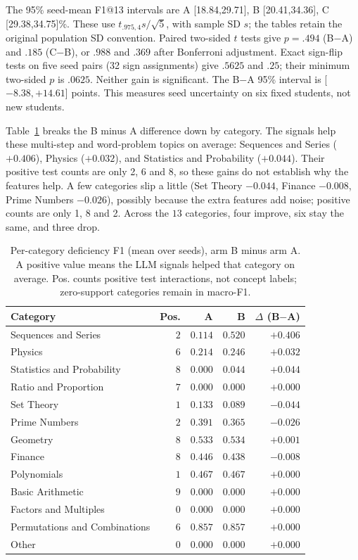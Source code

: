 \documentclass[11pt]{article}
\begin{document}
The 95\% seed-mean F1@13 intervals are A [18.84,29.71], B [20.41,34.36],
C [29.38,34.75]\%. These use $t_{.975,4}s/\sqrt5$, with sample SD $s$; the tables
retain the original population SD convention. Paired two-sided $t$ tests give
$p=.494$ (B$-$A) and $.185$ (C$-$B), or $.988$ and $.369$ after Bonferroni adjustment.
Exact sign-flip tests on five seed pairs (32 sign assignments) give $.5625$ and $.25$; their minimum two-sided $p$ is $.0625$. Neither gain is
significant. The B$-$A 95\% interval is [$-8.38,+14.61$] points. This measures seed uncertainty on six fixed students, not new students.


Table~\ref{tab:erroranalysis} breaks the B minus A difference down by category. The
signals help these multi-step and word-problem topics on average: Sequences and Series ($+0.406$),
Physics ($+0.032$), and Statistics and Probability ($+0.044$). Their positive test counts are only 2, 6 and 8, so these gains do not establish why the features help. A few
categories slip a little (Set Theory $-0.044$, Finance $-0.008$, Prime Numbers $-0.026$), possibly because the extra features add noise; positive counts are only 1, 8 and 2.
Across the $13$ categories, four improve, six stay the same, and three drop.

\begin{table}[t]
\centering
\caption{Per-category deficiency F1 (mean over seeds), arm B minus arm A. A positive
value means the LLM signals helped that category on average. Pos. counts positive test
interactions, not concept labels; zero-support categories remain in macro-F1.}
\label{tab:erroranalysis}
\small
\begin{tabular}{@{}lrrrr@{}}
\toprule
\textbf{Category} & \textbf{Pos.} & \textbf{A} & \textbf{B} & \textbf{$\Delta$ (B$-$A)}\\
\midrule
Sequences and Series & $2$ & $0.114$ & $0.520$ & $+0.406$\\
Physics & $6$ & $0.214$ & $0.246$ & $+0.032$\\
Statistics and Probability & $8$ & $0.000$ & $0.044$ & $+0.044$\\
Ratio and Proportion & $7$ & $0.000$ & $0.000$ & $+0.000$\\
Set Theory & $1$ & $0.133$ & $0.089$ & $-0.044$\\
Prime Numbers & $2$ & $0.391$ & $0.365$ & $-0.026$\\
Geometry & $8$ & $0.533$ & $0.534$ & $+0.001$\\
Finance & $8$ & $0.446$ & $0.438$ & $-0.008$\\
Polynomials & $1$ & $0.467$ & $0.467$ & $+0.000$\\
Basic Arithmetic & $9$ & $0.000$ & $0.000$ & $+0.000$\\
Factors and Multiples & $0$ & $0.000$ & $0.000$ & $+0.000$\\
Permutations and Combinations & $6$ & $0.857$ & $0.857$ & $+0.000$\\
Other & $0$ & $0.000$ & $0.000$ & $+0.000$\\
\bottomrule
\end{tabular}
\end{table}
\end{document}
